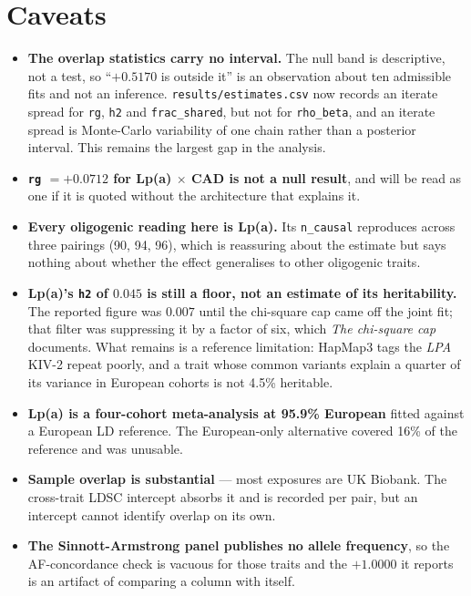\section*{Caveats}

\begin{itemize}\setlength{\itemsep}{0.35em}

\item \textbf{The overlap statistics carry no interval.} The null band is
descriptive, not a test, so ``$+0.5170$ is outside it'' is an observation about
ten admissible fits and not an inference. \texttt{results/estimates.csv} now
records an iterate spread for \texttt{rg}, \texttt{h2} and
\texttt{frac\_shared}, but not for \texttt{rho\_beta}, and an iterate spread is
Monte-Carlo variability of one chain rather than a posterior interval. This
remains the largest gap in the analysis.

\item \textbf{\texttt{rg} $= +0.0712$ for Lp(a) $\times$ CAD is not a null
result}, and will be read as one if it is quoted without the architecture that
explains it.

\item \textbf{Every oligogenic reading here is Lp(a).} Its \texttt{n\_causal}
reproduces across three pairings (90, 94, 96), which is reassuring about the
estimate but says nothing about whether the effect generalises to other
oligogenic traits.

\item \textbf{Lp(a)'s \texttt{h2} of $0.045$ is still a floor, not an
estimate of its heritability.} The reported figure was $0.007$ until the
chi-square cap came off the joint fit; that filter was suppressing it by a
factor of six, which \emph{The chi-square cap} documents. What remains is a
reference limitation: HapMap3 tags the \emph{LPA} KIV-2 repeat poorly, and a
trait whose common variants explain a quarter of its variance in European
cohorts is not 4.5\% heritable.

\item \textbf{Lp(a) is a four-cohort meta-analysis at 95.9\% European} fitted
against a European LD reference. The European-only alternative covered 16\% of
the reference and was unusable.

\item \textbf{Sample overlap is substantial} --- most exposures are UK Biobank.
The cross-trait LDSC intercept absorbs it and is recorded per pair, but an
intercept cannot identify overlap on its own.

\item \textbf{The Sinnott-Armstrong panel publishes no allele frequency}, so
the AF-concordance check is vacuous for those traits and the $+1.0000$ it
reports is an artifact of comparing a column with itself.

\end{itemize}
